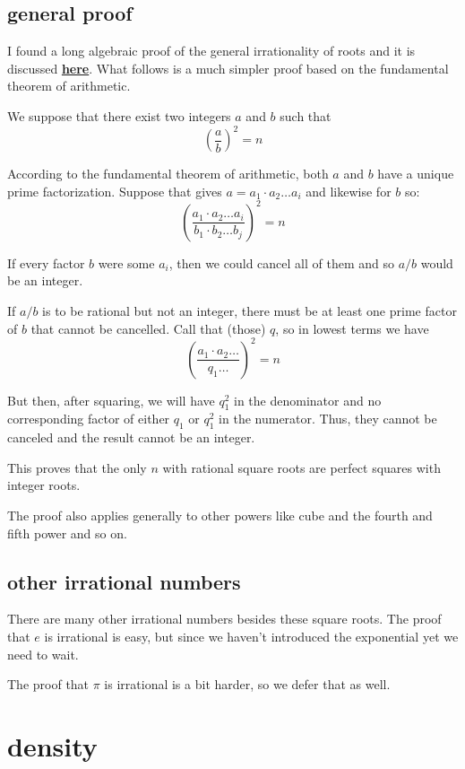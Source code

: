 \documentclass[11pt, oneside]{article}
\begin{document}
\subsection*{general proof}

I found a long algebraic proof of the general irrationality of roots and it is discussed \hyperref[sec:general_irrationality]{\textbf{here}}.  What follows is a much simpler proof based on the fundamental theorem of arithmetic.

We suppose that there exist two integers $a$ and $b$ such that 
\[ (\frac{a}{b})^2 = n \]

According to the fundamental theorem of arithmetic, both $a$ and $b$ have a unique prime factorization.  Suppose that gives $a = a_1 \cdot a_2 \dots a_i$ and likewise for $b$ so:
\[ (\frac{a_1 \cdot a_2 \dots a_i}{b_1 \cdot b_2 \dots b_j})^2 = n \]

If every factor $b$ were some $a_i$, then we could cancel all of them and so $a/b$ would be an integer.

If $a/b$ is to be rational but not an integer, there must be at least one prime factor of $b$ that cannot be cancelled.  Call that (those) $q$, so in lowest terms we have
\[ (\frac{a_1 \cdot a_2 \dots }{q_1 \dots})^2 = n \]

But then, after squaring, we will have $q_1^2$ in the denominator and no corresponding factor of either $q_1$ or $q_1^2$ in the numerator.  Thus, they cannot be canceled and the result cannot be an integer.

This proves that the only $n$ with rational square roots are perfect squares with integer roots.

The proof also applies generally to other powers like cube and the fourth and fifth power and so on.

\subsection*{other irrational numbers}

There are many other irrational numbers besides these square roots.  The proof that $e$ is irrational is easy, but since we haven't introduced the exponential yet we need to wait.  

The proof that $\pi$ is irrational is a bit harder, so we defer that as well.

\section*{density}
\end{document}

